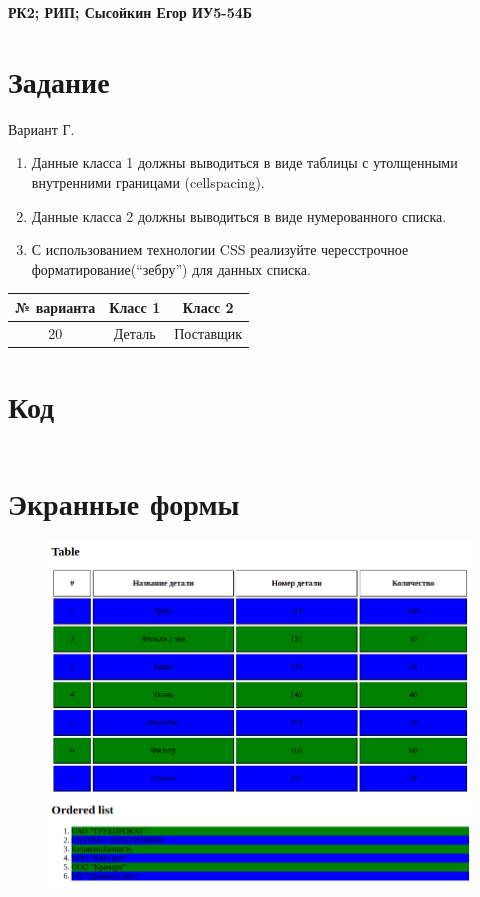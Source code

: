 \documentclass[20pt,a4paper]{report}
\begin{document}
	\large
	\textbf{РК2; РИП; Сысойкин Егор ИУ5-54Б} \\
	\chapter{Задание}
		Вариант Г.
		\begin{enumerate}
			\item Данные класса 1 должны выводиться в виде таблицы с утолщенными внутренними границами (cellspacing).
			\item Данные класса 2 должны выводиться в виде нумерованного списка.
			\item С использованием технологии CSS реализуйте чересстрочное форматирование(“зебру”) для данных списка.
		\end{enumerate}
		\begin{tabular}{|c|c|c|}
				\hline
				\textbf{№ варианта} & \textbf{Класс 1} & \textbf{Класс 2} \\ \hline
				20 & Деталь & Поставщик \\ \hline
		\end{tabular}

	\chapter{Код}
		\small
		\inputminted[tabsize=4, linenos]{html}{index.html}

	\chapter{Экранные формы}
		\begin{figure}[H]
			\centering
			\includegraphics[scale=0.7]{screen.png}
		\end{figure}
\end{document}
